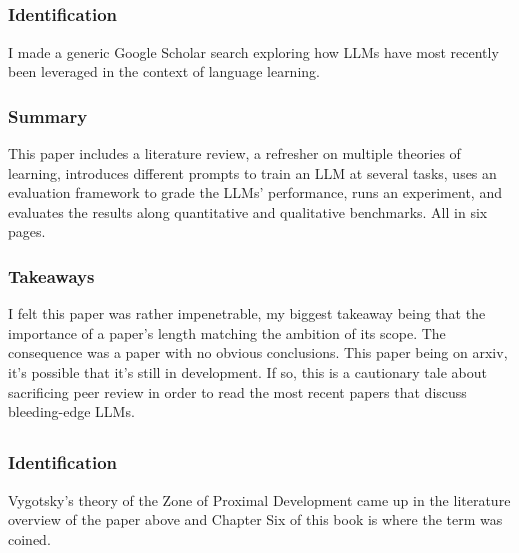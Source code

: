 \documentclass[
	letterpaper, %
]{jdf}
\begin{document}
\subsection{}
\subsubsection{Identification}
I made a generic Google Scholar search exploring how LLMs have most recently been leveraged in the context of language learning.

\subsubsection{Summary}
This paper includes a literature review, a refresher on multiple theories of learning, introduces different prompts to train an LLM at several tasks, uses an evaluation framework to grade the LLMs' performance, runs an experiment, and evaluates the results along quantitative and qualitative benchmarks. All in six pages. 

\subsubsection{Takeaways}
I felt this paper was rather impenetrable, my biggest takeaway being that the importance of a paper's length matching the ambition of its scope. The consequence was a paper with no obvious conclusions. This paper being on arxiv, it's possible that it's still in development. If so, this is a cautionary tale about sacrificing peer review in order to read the most recent papers that discuss bleeding-edge LLMs.

\subsection{}
\subsubsection{Identification}
Vygotsky's theory of the Zone of Proximal Development came up in the literature overview of the paper above and Chapter Six of this book is where the term was coined.
\end{document}
